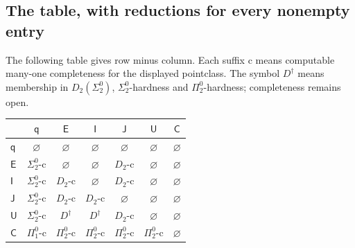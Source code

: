 \subsection{The table, with reductions for every nonempty entry}
\begin{theorem}\label{thm:differences}
The following table gives row minus column. Each suffix c means
computable many-one completeness for the displayed pointclass.
The symbol $D^\dagger$ means membership in $D_2(\Sigma^0_2)$,
$\Sigma^0_2$-hardness and $\Pi^0_2$-hardness; completeness remains open.
\begin{center}\small
\setlength{\tabcolsep}{5pt}
\begin{tabular}{@{}lcccccc@{}}
\toprule & $\mathsf q$&$\mathsf E$&$\mathsf I$&$\mathsf J$&$\mathsf U$&$\mathsf C$\\\midrule
$\mathsf q$&$\varnothing$&$\varnothing$&$\varnothing$&$\varnothing$&$\varnothing$&$\varnothing$\\
$\mathsf E$&$\Sigma^0_2$-c&$\varnothing$&$\varnothing$&$D_2$-c&$\varnothing$&$\varnothing$\\
$\mathsf I$&$\Sigma^0_2$-c&$D_2$-c&$\varnothing$&$D_2$-c&$\varnothing$&$\varnothing$\\
$\mathsf J$&$\Sigma^0_2$-c&$D_2$-c&$D_2$-c&$\varnothing$&$\varnothing$&$\varnothing$\\
$\mathsf U$&$\Sigma^0_2$-c&$D^\dagger$&$D^\dagger$&$D_2$-c&$\varnothing$&$\varnothing$\\
$\mathsf C$&$\Pi^0_1$-c&$\Pi^0_2$-c&$\Pi^0_2$-c&$\Pi^0_2$-c&$\Pi^0_2$-c&$\varnothing$\\\bottomrule
\end{tabular}
\end{center}
\end{theorem}
